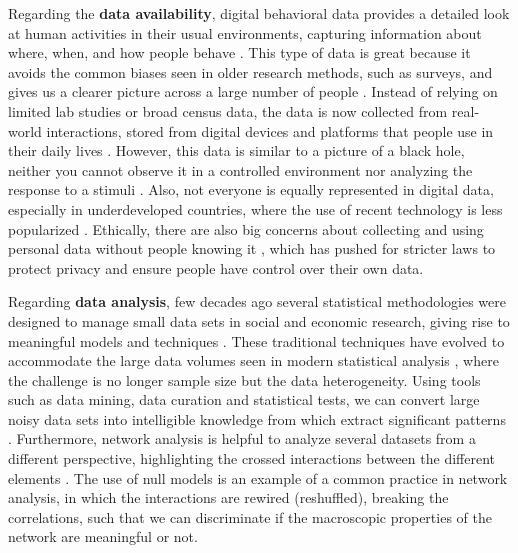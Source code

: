 Regarding the \textbf{data availability}, digital behavioral data provides a detailed look at human activities in their usual environments, capturing information about where, when, and how people behave \cite{Eagle2006RealityMining}. This type of data is great because it avoids the common biases seen in older research methods, such as surveys, and gives us a clearer picture across a large number of people \cite{lazer-2009,chen-2014}. Instead of relying on limited lab studies or broad census data, the data is now collected from real-world interactions, stored from digital devices and platforms that people use in their daily lives \cite{Eckmann2004Entropy,blondel-2015,artime-2017}. However, this data is similar to a picture of a black hole, neither you cannot observe it in a controlled environment nor analyzing the response to a stimuli \cite{lazer-2014}. Also, not everyone is equally represented in digital data, especially in underdeveloped countries, where the use of recent technology is less popularized \cite{zook-2017}. Ethically, there are also big concerns about collecting and using personal data without people knowing it \cite{boyd-2012, de-montjoye-2013}, which has pushed for stricter laws to protect privacy and ensure people have control over their own data.

Regarding  \textbf{data analysis}, few decades ago several statistical methodologies were designed to manage small data sets in social and economic research, giving rise to meaningful models and techniques \cite{stevens-2012, gelman-2006}. These traditional techniques have evolved to accommodate the large data volumes seen in modern statistical analysis \cite{hastie-2013}, where the challenge is no longer sample size but the data heterogeneity. Using tools such as data mining, data curation and statistical tests, we can convert large noisy data sets into intelligible knowledge from which extract significant patterns \cite{witten-2005}. Furthermore, network analysis is helpful to analyze several datasets from a different perspective, highlighting the crossed interactions between the different elements \cite{newman-book, clauset-2008}. The use of null models \cite{perry2012null,gauvin-2022} is an example of a common practice in network analysis, in which the interactions are rewired (reshuffled), breaking the correlations, such that we can discriminate if the macroscopic properties of the network are meaningful or not.


